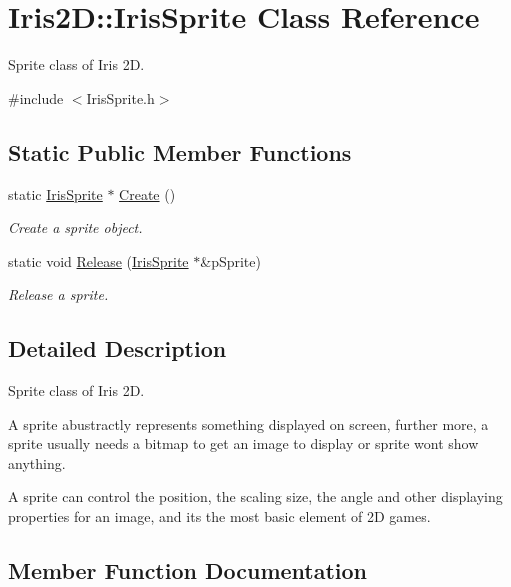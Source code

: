 \hypertarget{class_iris2_d_1_1_iris_sprite}{}\section{Iris2D\+:\+:Iris\+Sprite Class Reference}
\label{class_iris2_d_1_1_iris_sprite}


Sprite class of Iris 2D.  




{\ttfamily \#include $<$Iris\+Sprite.\+h$>$}

\subsection*{Static Public Member Functions}
\begin{DoxyCompactItemize}
\item 
static \hyperlink{class_iris2_d_1_1_iris_sprite}{Iris\+Sprite} $\ast$ \hyperlink{class_iris2_d_1_1_iris_sprite_ab68ea873fcd8521324c8497455dee852}{Create} ()
\begin{DoxyCompactList}\small\item\em Create a sprite object. \end{DoxyCompactList}\item 
static void \hyperlink{class_iris2_d_1_1_iris_sprite_aa225c6483e0282375187b092ea0cecf9}{Release} (\hyperlink{class_iris2_d_1_1_iris_sprite}{Iris\+Sprite} $\ast$\&p\+Sprite)
\begin{DoxyCompactList}\small\item\em Release a sprite. \end{DoxyCompactList}\end{DoxyCompactItemize}


\subsection{Detailed Description}
Sprite class of Iris 2D. 

A sprite abustractly represents something displayed on screen, further more, a sprite usually needs a bitmap to get an image to display or sprite won\textquotesingle{}t show anything.

A sprite can control the position, the scaling size, the angle and other displaying properties for an image, and it\textquotesingle{}s the most basic element of 2D games. 

\subsection{Member Function Documentation}
\mbox{\label{class_iris2_d_1_1_iris_sprite_ab68ea873fcd8521324c8497455dee852}} 
